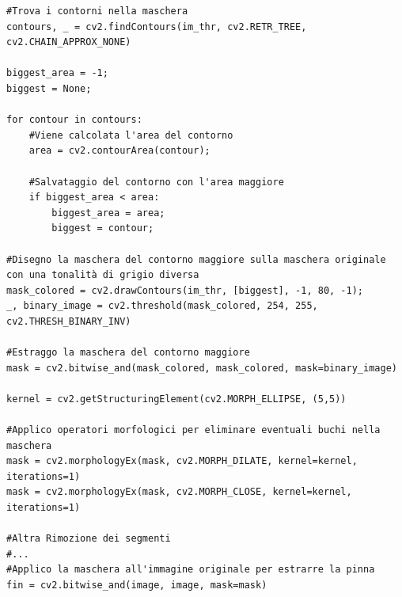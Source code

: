 \documentclass[a4paper,12pt]{report}
\begin{document}
\begin{lstlisting}
#Trova i contorni nella maschera
contours, _ = cv2.findContours(im_thr, cv2.RETR_TREE, cv2.CHAIN_APPROX_NONE)

biggest_area = -1;
biggest = None;

for contour in contours:
    #Viene calcolata l'area del contorno
    area = cv2.contourArea(contour);

    #Salvataggio del contorno con l'area maggiore
    if biggest_area < area:
        biggest_area = area;
        biggest = contour;

#Disegno la maschera del contorno maggiore sulla maschera originale con una tonalità di grigio diversa
mask_colored = cv2.drawContours(im_thr, [biggest], -1, 80, -1);
_, binary_image = cv2.threshold(mask_colored, 254, 255, cv2.THRESH_BINARY_INV)

#Estraggo la maschera del contorno maggiore
mask = cv2.bitwise_and(mask_colored, mask_colored, mask=binary_image)

kernel = cv2.getStructuringElement(cv2.MORPH_ELLIPSE, (5,5))

#Applico operatori morfologici per eliminare eventuali buchi nella maschera
mask = cv2.morphologyEx(mask, cv2.MORPH_DILATE, kernel=kernel, iterations=1)
mask = cv2.morphologyEx(mask, cv2.MORPH_CLOSE, kernel=kernel, iterations=1)

#Altra Rimozione dei segmenti
#...
#Applico la maschera all'immagine originale per estrarre la pinna
fin = cv2.bitwise_and(image, image, mask=mask)
\end{lstlisting}
\end{document}
